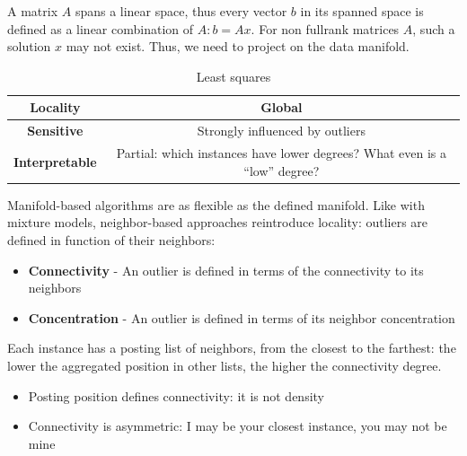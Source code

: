 A matrix $A$ spans a linear space, thus every vector $b$ in its spanned space is defined as a
linear combination of $A: b = Ax$. For non fullrank matrices $A$, such a solution $x$ may not exist. Thus, we need to project on the data manifold.



\begin{table}[htbp]
   \centering
   \begin{tabular}{|c|c|}
      \textbf{Locality} & \textbf{Global} \\
      \hline
      \textbf{Sensitive} & Strongly influenced by outliers \\
      \hline
      \textbf{Interpretable} & Partial: which instances have lower degrees? What even is a ``low'' degree?\\
      
   \end{tabular}
   \caption{Least squares}
   \label{tab:least_squares}
\end{table}

Manifold-based algorithms are as flexible as the defined manifold. Like with mixture models, neighbor-based approaches reintroduce locality: outliers are defined in function of their neighbors:
\begin{itemize}
	\item \textbf{Connectivity} - An outlier is defined in terms of the connectivity to its neighbors
	\item \textbf{Concentration} - An outlier is defined in terms of its neighbor concentration
\end{itemize}

Each instance has a posting list of neighbors, from
the closest to the farthest: the lower the aggregated
position in other lists, the higher the connectivity
degree.
\begin{itemize}
	\item Posting position defines connectivity: it is not density
	\item Connectivity is asymmetric: I may be your closest instance, you may not be mine
\end{itemize}


